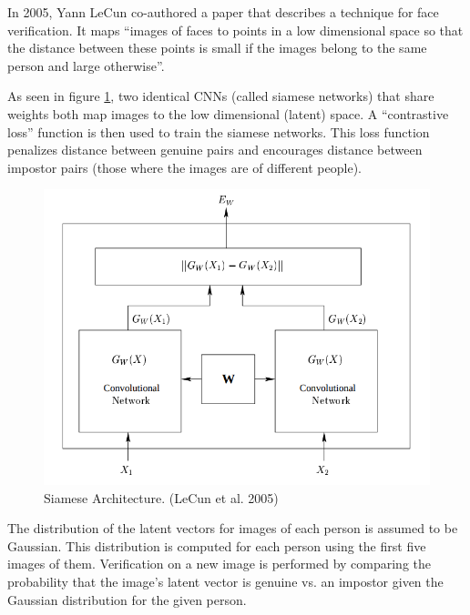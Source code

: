 In 2005, Yann LeCun co-authored a paper that describes a technique for face verification.
It maps ``images of faces to points in a low dimensional space so that the distance between these points is small if the images belong to the same person and large otherwise''\cite{LeCun}.


As seen in figure \ref{fig:siamese}, two identical CNNs (called siamese networks) that share weights both map images to the low dimensional (latent) space.
A ``contrastive loss'' function is then used to train the siamese networks.
This loss function penalizes distance between genuine pairs and encourages distance between impostor pairs (those where the images are of different people)\cite{LeCun}.
\begin{figure}[h]
    \begin{center}
        \includegraphics[width=0.8\linewidth]{siamese_architecture.png}
    \end{center}
    \caption{Siamese Architecture. (LeCun et al. 2005)}
    \label{fig:siamese}
\end{figure}

The distribution of the latent vectors for images of each person is assumed to be Gaussian.
This distribution is computed for each person using the first five images of them.
Verification on a new image is performed by comparing the probability that the image's latent vector is genuine vs. an impostor given the Gaussian distribution for the given person\cite{LeCun}.


